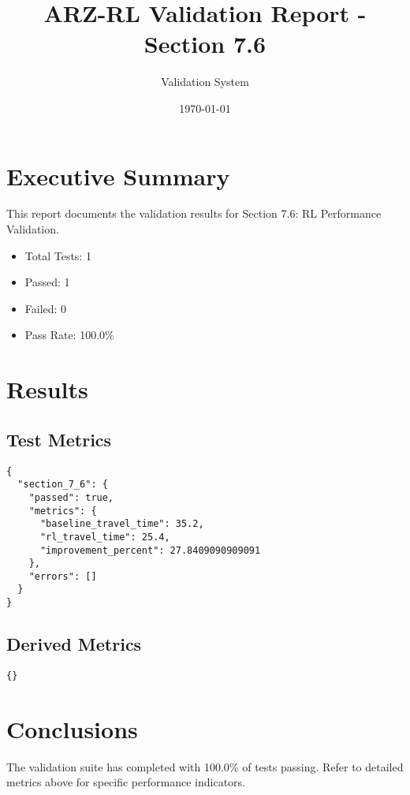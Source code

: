 \documentclass[12pt,a4paper]{article}
\title{ARZ-RL Validation Report - Section 7.6}
\author{Validation System}
\date{\today}
\begin{document}
\maketitle

\section{Executive Summary}

This report documents the validation results for Section 7.6: RL Performance Validation.

\begin{itemize}
    \item Total Tests: 1
    \item Passed: 1
    \item Failed: 0
    \item Pass Rate: 100.0\%
\end{itemize}

\section{Results}

\subsection{Test Metrics}

\begin{verbatim}
{
  "section_7_6": {
    "passed": true,
    "metrics": {
      "baseline_travel_time": 35.2,
      "rl_travel_time": 25.4,
      "improvement_percent": 27.8409090909091
    },
    "errors": []
  }
}
\end{verbatim}

\subsection{Derived Metrics}

\begin{verbatim}
{}
\end{verbatim}

\section{Conclusions}

The validation suite has completed with 100.0\% of tests passing.
Refer to detailed metrics above for specific performance indicators.
\end{document}
